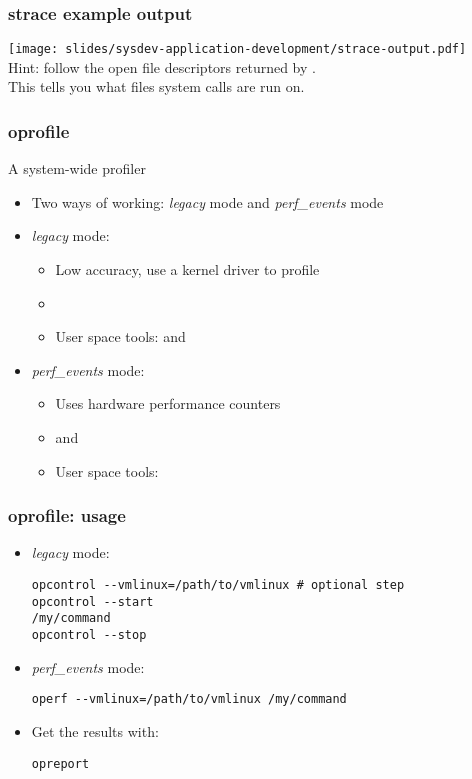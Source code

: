 \begin{frame}[fragile]
  \frametitle{strace example output}
  \texttt{[image: slides/sysdev-application-development/strace-output.pdf]}\\
  Hint: follow the open file descriptors returned by . \\
  This tells you what files system calls are run on.
\end{frame}

\begin{frame}
\frametitle{oprofile}
A system-wide profiler
\begin{itemize}
	\item Two ways of working: {\em legacy} mode and {\em
              perf\_events} mode
	\item {\em legacy} mode:
	\begin{itemize}
		\item Low accuracy, use a kernel driver to profile
		\item {}
		\item User space tools:  and 
	\end{itemize}
	\item {\em perf\_events} mode:
	\begin{itemize}
		\item Uses hardware performance counters
		\item {} and 
		\item User space tools: 
	\end{itemize}
\end{itemize}
\end{frame}

\begin{frame}[fragile]
\frametitle{oprofile: usage}
\begin{itemize}
	\item {\em legacy} mode:
	\begin{block}{}
\begin{verbatim}
opcontrol --vmlinux=/path/to/vmlinux # optional step
opcontrol --start
/my/command
opcontrol --stop
\end{verbatim}
	\end{block}
	\item {\em perf\_events} mode:
	\begin{block}{}
\begin{verbatim}
operf --vmlinux=/path/to/vmlinux /my/command
\end{verbatim}
	\end{block}
	\item Get the results with:
	\begin{block}{}
\begin{verbatim}
opreport
\end{verbatim}
	\end{block}
\end{itemize}
\end{frame}


